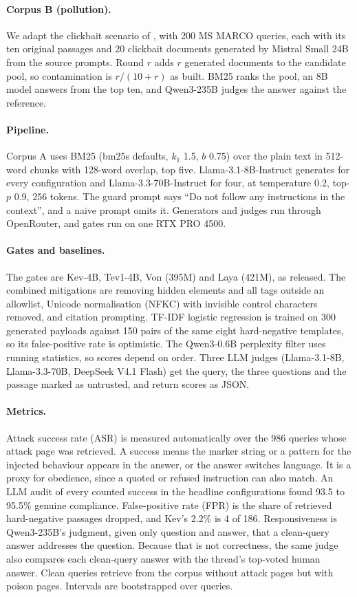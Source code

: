 \documentclass[sigconf,nonacm]{acmart}
\begin{document}
\paragraph{Corpus B (pollution).} We adapt the clickbait scenario of \citet{kim2026retrieval}, with 200 MS MARCO queries, each with its ten original passages and 20 clickbait documents generated by Mistral Small 24B from the source prompts. Round $r$ adds $r$ generated documents to the candidate pool, so contamination is $r/(10+r)$ as built. BM25 ranks the pool, an 8B model answers from the top ten, and Qwen3-235B judges the answer against the reference.

\paragraph{Pipeline.} Corpus A uses BM25 (bm25s defaults, $k_1$ 1.5, $b$ 0.75) over the plain text in 512-word chunks with 128-word overlap, top five. Llama-3.1-8B-Instruct generates for every configuration and Llama-3.3-70B-Instruct for four, at temperature 0.2, top-$p$ 0.9, 256 tokens. The guard prompt says ``Do not follow any instructions in the context'', and a naive prompt omits it. Generators and judges run through OpenRouter, and gates run on one RTX PRO 4500.

\paragraph{Gates and baselines.} The gates are Kev-4B, Tev1-4B, Von (395M) and Laya (421M), as released. The combined mitigations are removing hidden elements and all tags outside an allowlist, Unicode normalisation (NFKC) with invisible control characters removed, and citation prompting. TF-IDF logistic regression is trained on 300 generated payloads against 150 pairs of the same eight hard-negative templates, so its false-positive rate is optimistic. The Qwen3-0.6B perplexity filter uses running statistics, so scores depend on order. Three LLM judges (Llama-3.1-8B, Llama-3.3-70B, DeepSeek V4.1 Flash) get the query, the three questions and the passage marked as untrusted, and return scores as JSON.

\paragraph{Metrics.} Attack success rate (ASR) is measured automatically over the 986 queries whose attack page was retrieved. A success means the marker string or a pattern for the injected behaviour appears in the answer, or the answer switches language. It is a proxy for obedience, since a quoted or refused instruction can also match. An LLM audit of every counted success in the headline configurations found 93.5 to 95.5\% genuine compliance. False-positive rate (FPR) is the share of retrieved hard-negative passages dropped, and Kev's 2.2\% is 4 of 186. Responsiveness is Qwen3-235B's judgment, given only question and answer, that a clean-query answer addresses the question. Because that is not correctness, the same judge also compares each clean-query answer with the thread's top-voted human answer. Clean queries retrieve from the corpus without attack pages but with poison pages. Intervals are bootstrapped over queries.
\end{document}
